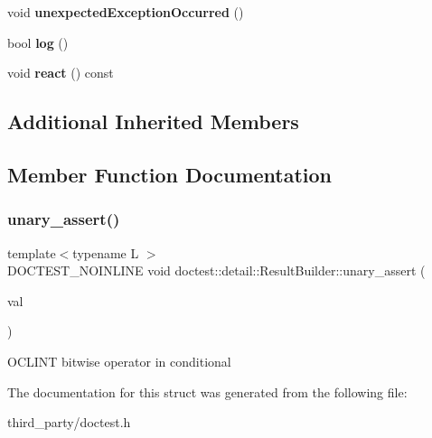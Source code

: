 \begin{DoxyCompactItemize}
\item 
\mbox{\label{structdoctest_1_1detail_1_1_result_builder_a538572e474860eee7c9373fba168b0eb}} 
void {\bfseries unexpected\+Exception\+Occurred} ()
\item 
\mbox{\label{structdoctest_1_1detail_1_1_result_builder_a2af75dd1d8db8d3aa949d78025854085}} 
bool {\bfseries log} ()
\item 
\mbox{\label{structdoctest_1_1detail_1_1_result_builder_a03686f862471728c2980d72e02980213}} 
void {\bfseries react} () const
\end{DoxyCompactItemize}
\subsection*{Additional Inherited Members}


\subsection{Member Function Documentation}
\mbox{\label{structdoctest_1_1detail_1_1_result_builder_a98c33e90242e2859255a79cb38489f3b}} 
\subsubsection{\texorpdfstring{unary\_assert()}{unary\_assert()}}
{\footnotesize\ttfamily template$<$typename L $>$ \\
D\+O\+C\+T\+E\+S\+T\+\_\+\+N\+O\+I\+N\+L\+I\+NE void doctest\+::detail\+::\+Result\+Builder\+::unary\+\_\+assert (\begin{DoxyParamCaption}\item[{const D\+O\+C\+T\+E\+S\+T\+\_\+\+R\+E\+F\+\_\+\+W\+R\+AP(L)}]{val }\end{DoxyParamCaption})\hspace{0.3cm}{\ttfamily [inline]}}

O\+C\+L\+I\+NT bitwise operator in conditional 

The documentation for this struct was generated from the following file\+:\begin{DoxyCompactItemize}
\item 
third\+\_\+party/doctest.\+h\end{DoxyCompactItemize}
